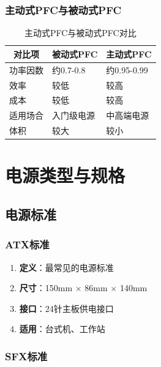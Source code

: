 \documentclass[12pt,UTF8]{ctexbook}
\begin{document}
\section{主动式PFC与被动式PFC}

\begin{table}[H]
    \centering
    \begin{tabularx}{\textwidth}{|p{4cm}|X|X|}
        \hline
        \multicolumn{1}{|c|}{\textbf{对比项}} & \multicolumn{1}{c|}{\textbf{被动式PFC}} & \multicolumn{1}{c|}{\textbf{主动式PFC}} \\
        \hline
        功率因数 & 约0.7-0.8 & 约0.95-0.99 \\
        \hline
        效率 & 较低 & 较高 \\
        \hline
        成本 & 较低 & 较高 \\
        \hline
        适用场合 & 入门级电源 & 中高端电源 \\
        \hline
        体积 & 较大 & 较小 \\
        \hline
    \end{tabularx}
    \caption{主动式PFC与被动式PFC对比}
    \label{tab:pfc_comparison}
\end{table}

\part{电源类型与规格}

\chapter{电源标准}

\section{ATX标准}

\begin{enumerate}
    \item \textbf{定义}：最常见的电源标准
    \item \textbf{尺寸}：150mm × 86mm × 140mm
    \item \textbf{接口}：24针主板供电接口
    \item \textbf{适用}：台式机、工作站
\end{enumerate}

\section{SFX标准}
\end{document}
